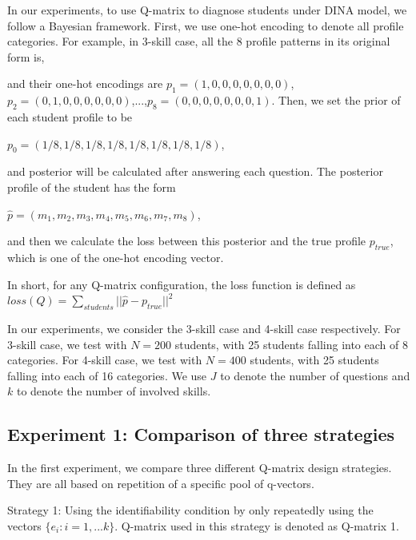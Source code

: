 \documentclass{edm_template}
\begin{document}
In our experiments, to use Q-matrix to diagnose students under DINA model, we follow a Bayesian framework. First, we use one-hot encoding to denote all profile categories. For example, in 3-skill case, all the 8 profile patterns in its original form is,

and their one-hot encodings are 
$p_1=(1,0,0,0,0,0,0,0)$, $p_2=(0,1,0,0,0,0,0,0)$,...,$p_8=(0,0,0,0,0,0,0,1)$.
Then, we set the prior of each student profile to be 

$p_0=(1/8,1/8,1/8,1/8,1/8,1/8,1/8,1/8)$, 

and posterior will be calculated after answering each question. The posterior profile of the student has the form 

$\hat{p} = (m_1,m_2,m_3,m_4,m_5,m_6,m_7,m_8)$, 

and then we calculate the loss between this posterior and the true profile $p_{true}$, which is one of the one-hot encoding vector. 

In short, for any Q-matrix configuration, the loss function is defined as
$ loss(Q) = \sum_{students} ||\hat{p} - p_{true}||^2$

In our experiments, we consider the 3-skill case and 4-skill case respectively. For 3-skill case, we test with $N=200$ students, with 25 students falling into each of 8 categories. For 4-skill case, we test with $N=400$ students, with 25 students falling into each of 16 categories. We use $J$ to denote the number of questions and $k$ to denote the number of involved skills.

\subsection{Experiment 1: Comparison of three strategies}
In the first experiment, we compare three different Q-matrix design strategies. They are all based on repetition of a specific pool of q-vectors.

Strategy 1: Using the identifiability condition by only repeatedly using the vectors $\{e_{i}:i=1,...k\}$. Q-matrix used in this strategy is denoted as Q-matrix 1.
\end{document}
